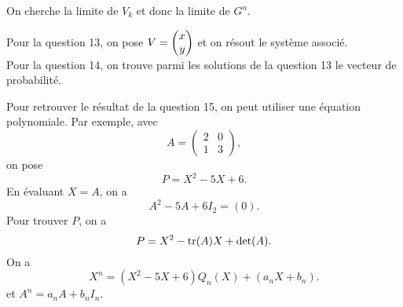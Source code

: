 On cherche la limite de $V_k$ et donc la limite de $G^n$.

Pour la question 13, on pose $V = \begin{pmatrix} x\\y \end{pmatrix}$ et on résout le système associé.\\
Pour la question 14, on trouve parmi les solutions de la question 13 le vecteur de probabilité.\\
\begin{mdframed}
	Pour retrouver le résultat de la question 15, on peut utiliser une équation polynomiale. Par exemple, avec \[
		A = \begin{pmatrix}
			2&0\\
			1&3
		\end{pmatrix},
	\] on pose \[
		P = X^2 - 5X + 6.
	\] En évaluant $X = A$, on a \[
		A^2 - 5A + 6I_2 = (0)
	.\] Pour trouver $P$, on a \[
		P = X^2 - \operatorname{tr}(A) X + \operatorname{det}(A).
	\] On a \[
		X^n = (X^2 - 5X + 6) Q_n(X) + (a_n X + b_n).
	\] et $A^n = a_n A + b_n I_n$.
\end{mdframed}



